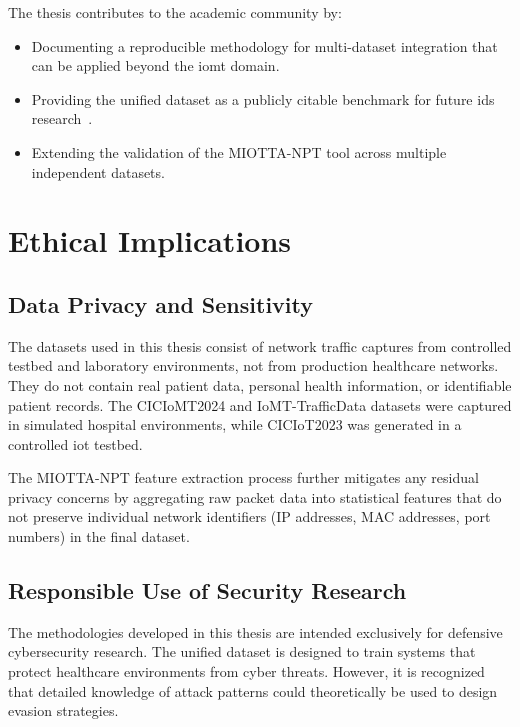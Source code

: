 The thesis contributes to the academic community by:

\begin{itemize}
    \item Documenting a reproducible methodology for multi-dataset integration that can be applied beyond the \gls{iomt} domain.
    \item Providing the unified dataset as a publicly citable benchmark for future \gls{ids} research~\cite{unified_iomt_csuc2026}.
    \item Extending the validation of the MIOTTA-NPT tool across multiple independent datasets.
\end{itemize}

\section{Ethical Implications}
\label{sec:ethical}

\subsection{Data Privacy and Sensitivity}

The datasets used in this thesis consist of network traffic captures from controlled testbed and laboratory environments, not from production healthcare networks. They do not contain real patient data, personal health information, or identifiable patient records. The CICIoMT2024 and IoMT-TrafficData datasets were captured in simulated hospital environments, while CICIoT2023 was generated in a controlled \gls{iot} testbed.

The MIOTTA-NPT feature extraction process further mitigates any residual privacy concerns by aggregating raw packet data into statistical features that do not preserve individual network identifiers (IP addresses, MAC addresses, port numbers) in the final dataset.

\subsection{Responsible Use of Security Research}

The methodologies developed in this thesis are intended exclusively for defensive cybersecurity research. The unified dataset is designed to train systems that protect healthcare environments from cyber threats. However, it is recognized that detailed knowledge of attack patterns could theoretically be used to design evasion strategies.

